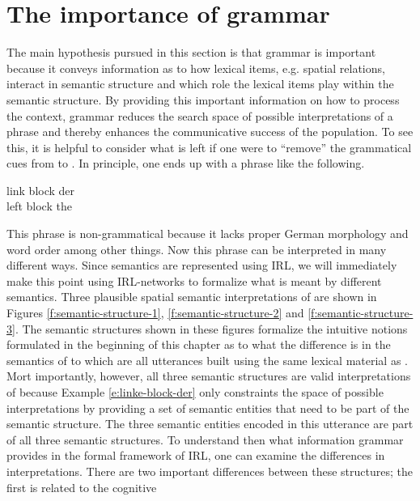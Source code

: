 \section{The importance of grammar}
The main hypothesis pursued in this section is that grammar is important because it 
conveys information as to how lexical items, e.g. spatial relations, interact in semantic structure
and which role the lexical items play within the semantic structure. 
By providing this important information on how to process the context,
grammar reduces the search space of possible interpretations of a phrase and 
thereby enhances the communicative success of the population.
To see this, it is helpful to consider what is left if one were to ``remove'' the 
grammatical cues from  to .
In principle, one ends up with a phrase like the following.
\begin{exe}
\ex\label{e:linke-block-der}
\gll link block der\\
left block the\\
\end{exe}
This phrase is non-grammatical because it lacks proper German morphology
and word order among other things. Now this phrase can 
be interpreted in many different ways. 
Since semantics are represented using IRL, we
will immediately make this point using IRL-networks 
to formalize what is meant by different 
semantics. Three plausible spatial semantic interpretations 
of  are 
shown in Figures \ref{f:semantic-structure-1}, 
\ref{f:semantic-structure-2} and \ref{f:semantic-structure-3}.
The semantic structures shown in these figures formalize 
the intuitive notions formulated
in the beginning of this chapter as to what the difference is in 
the semantics of  to 
which are all utterances built using the same lexical material as .
Mort importantly, however, all three semantic structures are valid interpretations of 
 because Example  \ref{e:linke-block-der} 
only constraints the space of possible interpretations by providing
a set of semantic entities that need to be part of the semantic structure. The three 
semantic entities encoded in this utterance are part of all three semantic structures. 
To understand then what information grammar
provides in the formal framework of IRL, 
one can examine the differences in interpretations. 
There are two important differences 
between these structures; the first is related to the cognitive
